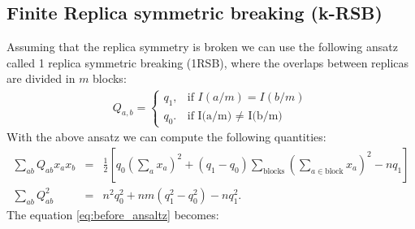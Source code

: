 \documentclass[aps,physrev,10pt,floatfix,longbibliography,nofootinbib,reprint]{revtex4-2}
\begin{document}
\subsection{Finite Replica symmetric breaking (k-RSB)}
Assuming that the replica symmetry is broken we can use the following ansatz called 1 replica symmetric breaking (1RSB), where the overlaps between replicas are divided in $m$ blocks:
\begin{eqnarray}
    Q_{a,b}=\begin{cases}
			q_1, & \text{if $I(a/m)=I(b/m)$}\\
            q_0. & \text{if I(a/m) $\neq$ I(b/m)}
		 \end{cases}
\end{eqnarray}
With the above ansatz we can compute the following quantities:
\begin{eqnarray}
\sum_{ab} Q_{ab} x_{a} x_{b} &=& \frac{1}{2} \left[ q_0 \left( \sum_{a}x_a\right)^2 + (q_1-q_0) \sum_{\text{blocks}} \left( \sum_{a \in \text{block}}x_a\right)^2  -nq_1\right] \\
\sum_{ab} Q_{ab}^2 &=&  n^2 q_0^2 + nm(q_1^2 - q_0^2) -n q_1^2.
\end{eqnarray}
The equation \ref{eq:before_ansaltz} becomes:
\end{document}
